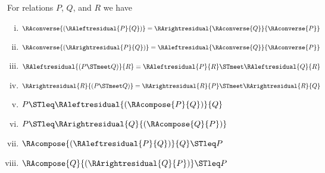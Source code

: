 \begin{proposition}
\label{prop:residueproperties}
	For relations $P$, $Q$, and $R$ we have
	\begin{enumerate}[(i)]
		\item $\RAconverse{(\RAleftresidual{P}{Q})} = \RArightresidual{\RAconverse{Q}}{\RAconverse{P}}$
		\item $\RAconverse{(\RArightresidual{P}{Q})} = \RAleftresidual{\RAconverse{Q}}{\RAconverse{P}}$
		\item $\RAleftresidual{(P \STmeet Q)}{R} = \RAleftresidual{P}{R} \STmeet \RAleftresidual{Q}{R}$
		\item $\RArightresidual{R}{(P \STmeet Q)} = \RArightresidual{R}{P} \STmeet \RArightresidual{R}{Q}$
		\item $P \STleq \RAleftresidual{(\RAcompose{P}{Q})}{Q}$
		\item $P \STleq \RArightresidual{Q}{(\RAcompose{Q}{P})}$
		\item $\RAcompose{(\RAleftresidual{P}{Q})}{Q} \STleq P$
		\item $\RAcompose{Q}{(\RArightresidual{Q}{P})} \STleq P$
	\end{enumerate}	
\end{proposition}